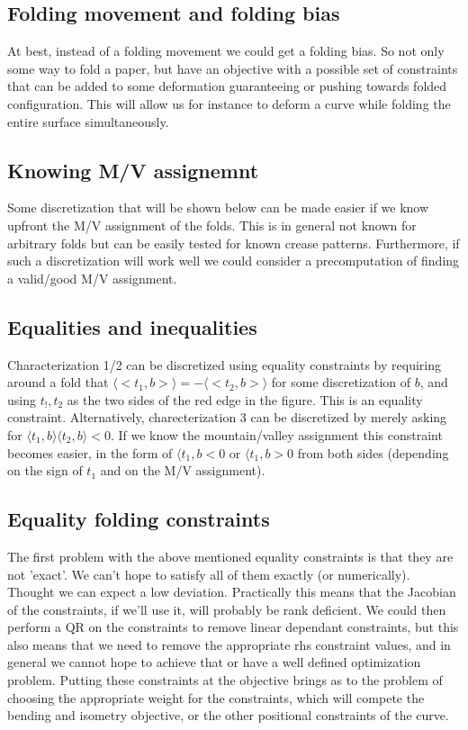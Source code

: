 \documentclass{article}
\theoremstyle{definition}
\begin{document}
\subsection{Folding movement and folding bias}
At best, instead of a folding movement we could get a folding bias. So not only some way to fold a paper, but have an objective with a possible set of constraints that can be added to some deformation guaranteeing or pushing towards folded configuration. This will allow us for instance to deform a curve while folding the entire surface simultaneously.

\subsection{Knowing M/V assignemnt}
Some discretization that will be shown below can be made easier if we know upfront the M/V assignment of the folds. This is in general not known for arbitrary folds but can be easily tested for known crease patterns. Furthermore, if such a discretization will work well we could consider a precomputation of finding a valid/good M/V assignment.

\subsection{Equalities and inequalities}
Characterization 1/2 can be discretized using equality constraints by requiring around a fold that  $\langle <t_1,b> \rangle = -\langle <t_2,b> \rangle$ for some discretization of $b$, and using $t_!,t_2$ as the two sides of the red edge in the figure. This is an equality constraint. Alternatively, charecterization 3 can be discretized by merely asking for $\langle t_1,b \rangle \langle t_2,b \rangle < 0$. If we know the mountain/valley assignment this constraint becomes easier, in the form of $\langle t_1,b < 0$ or $\langle t_1,b > 0$ from both sides (depending on the sign of $t_1$ and on the M/V assignment).

\subsection{Equality folding constraints}
The first problem with the above mentioned equality constraints is that they are not 'exact'. We can't hope to satisfy all of them exactly (or numerically). Thought we can expect a low deviation. Practically this means that the Jacobian of the constraints, if we'll use it, will probably be rank deficient. We could then perform a QR on the constraints to remove linear dependant constraints, but this also means that we need to remove the appropriate rhs constraint values, and in general we cannot hope to achieve that or have a well defined optimization problem. Putting these constraints at the objective brings as to the problem of choosing the appropriate weight for the constraints, which will compete the bending and isometry objective, or the other positional constraints of the curve.
\end{document}
